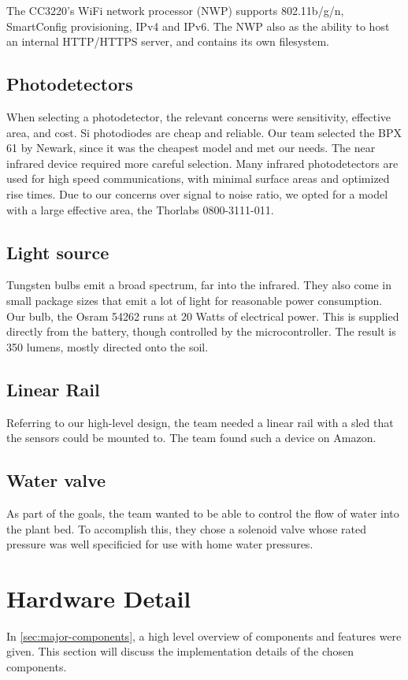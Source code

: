 \documentclass[journal]{IEEEtran}
\begin{document}
The CC3220's WiFi network processor (NWP) supports 802.11b/g/n, SmartConfig provisioning, IPv4 and IPv6. The NWP also as the ability to host an internal HTTP/HTTPS server, and contains its own filesystem.
\subsection{Photodetectors}
When selecting a photodetector, the relevant concerns were sensitivity, effective area, and cost. Si photodiodes are cheap and reliable. Our team selected the BPX 61 by Newark, since it was the cheapest model and met our needs. The near infrared device required more careful selection. Many infrared photodetectors are used for high speed communications, with minimal surface areas and optimized rise times. Due to our concerns over signal to noise ratio, we opted for a model with a large effective area, the Thorlabs 0800-3111-011.
\subsection{Light source}
Tungsten bulbs emit a broad spectrum, far into the infrared. They also come in small package sizes that emit a lot of light for reasonable power consumption. Our bulb, the Osram 54262 runs at 20 Watts of electrical power. This is supplied directly from the battery, though controlled by the microcontroller. The result is 350 lumens, mostly directed onto the soil.
\subsection{Linear Rail}
Referring to our high-level design, the team needed a linear rail with a sled that the sensors could be mounted to.
The team found such a device on Amazon.
\subsection{Water valve}
As part of the goals, the team wanted to be able to control the flow of water
into the plant bed. To accomplish this, they chose a solenoid valve whose rated pressure was well specificied for use with home water pressures.
\section{Hardware Detail}
In \autoref{sec:major-components}, a high level overview of components and features were given. This
section will discuss the implementation details of the chosen components.
\end{document}
